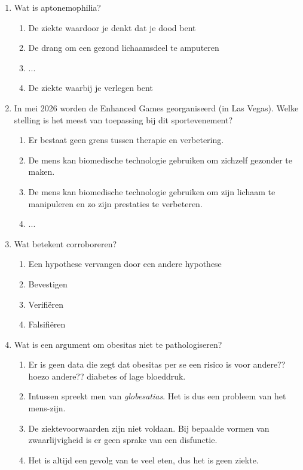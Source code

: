 \documentclass[kulak]{kulakarticle}
\begin{document}
	\begin{enumerate}
		\item Wat is aptonemophilia?
		\begin{enumerate}
			\item De ziekte waardoor je denkt dat je dood bent
			\item De drang om een gezond lichaamsdeel te amputeren
			\item ...
			\item De ziekte waarbij je verlegen bent
		\end{enumerate}
		\item In mei 2026 worden de Enhanced Games georganiseerd (in Las Vegas). Welke stelling is het meest van toepassing bij dit sportevenement?
		\begin{enumerate}
			\item Er bestaat geen grens tussen therapie en verbetering.
			\item De mens kan biomedische technologie gebruiken om zichzelf gezonder te maken.
			\item De mens kan biomedische technologie gebruiken om zijn lichaam te manipuleren en zo zijn prestaties te verbeteren.
			\item ...
		\end{enumerate}
		\item Wat betekent corroboreren?
		\begin{enumerate}
			\item Een hypothese vervangen door een andere hypothese
			\item Bevestigen
			\item Verifiëren
			\item Falsifiëren
		\end{enumerate}
		\newpage
		\item Wat is een argument om obesitas niet te pathologiseren?
		\begin{enumerate}
			\item Er is geen data die zegt dat obesitas per se een risico is voor andere?? hoezo andere?? diabetes of lage bloeddruk.
			\item Intussen spreekt men van \textit{globesatias}. Het is dus een probleem van het mens-zijn.
			\item De ziektevoorwaarden zijn niet voldaan. Bij bepaalde vormen van zwaarlijvigheid is er geen sprake van een disfunctie.
			\item Het is altijd een gevolg van te veel eten, dus het is geen ziekte.
		\end{enumerate}

\end{enumerate}
\end{document}
